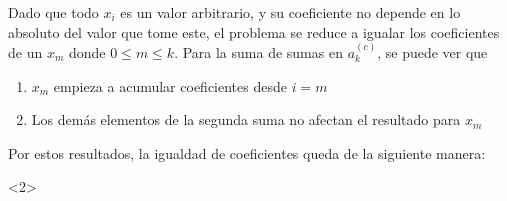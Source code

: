     \vspace{1cm}
    Dado que todo $x_i$ es un valor arbitrario, y su coeficiente no depende en lo absoluto
    del valor que tome este, el problema se reduce a igualar los coeficientes de un $x_m$
    donde $0 \leq m \leq k$.
    Para la suma de sumas en $a_k^{(c)}$, se puede ver que
    \begin{enumerate}[label=(\Roman*)]
        \item $x_m$ empieza a acumular coeficientes desde $i=m$
        \item Los demás elementos de la segunda suma no afectan el resultado para $x_m$
    \end{enumerate}
    Por estos resultados, la igualdad de coeficientes queda de la siguiente manera:
    \vspace{1cm}
        \begin{longderivation}<2>
                \\
            \\
                \\
            \why*{}\\
                \\
            \\
                \\
            \\
                \\
            \\
                \\
            \why*{}\\
                \\
            \why*{}\\
        \end{longderivation}

